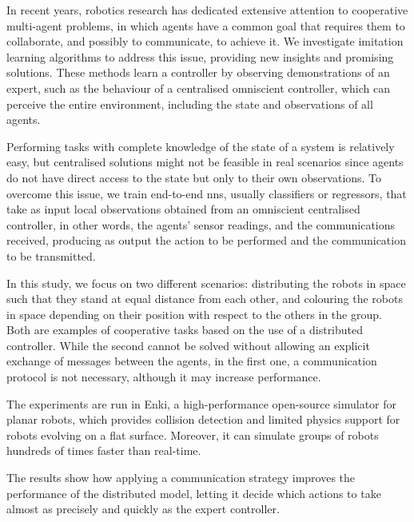 In recent years, robotics research has dedicated extensive attention to cooperative 
multi-agent problems, in which agents have a common goal that requires them to 
collaborate, and possibly to communicate, to achieve it.
We investigate imitation learning algorithms to address this issue, providing new 
insights and promising solutions. 
These methods learn a controller by observing demonstrations of an expert, such 
as the behaviour of a centralised omniscient controller, which can perceive the 
entire environment, including the state and observations of all agents. 

Performing tasks with complete knowledge of the state of a system is relatively 
easy, but centralised solutions might not be feasible in real scenarios since agents 
do not have direct access to the state but only to their own observations.
To overcome this issue, we train end-to-end \glspl{nn}, usually classifiers or 
regressors, that take as input local observations obtained from an omniscient 
centralised controller, in other words, the agents' sensor readings, and the 
communications received, producing as output the action to be performed and 
the communication to be transmitted.

In this study, we focus on two different scenarios: distributing the robots in space 
such that they stand at equal distance from each other, and colouring the robots 
in space depending on their position with respect to the others in the group.
Both are examples of cooperative tasks based on the use of a distributed 
controller. While the second cannot be solved without allowing an explicit 
exchange of messages between the agents, in the first one, a communication 
protocol is not necessary, although it may increase performance.

The experiments are run in Enki, a high-performance open-source simulator for 
planar robots, which provides collision detection and limited physics support for 
robots evolving on a flat surface. Moreover, it can simulate groups of robots 
hundreds of times faster than real-time.


The results show how applying a communication strategy improves the 
performance of the distributed model, letting it decide which actions to take 
almost as precisely and quickly as the expert controller.